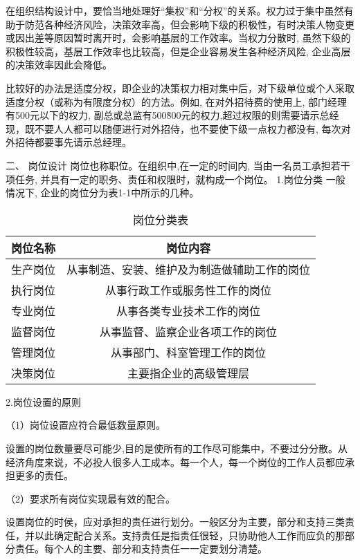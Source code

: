 \documentclass[CJK]{z-article}
\begin{document}
    在组织结构设计中，要恰当地处理好“集权”和“分权”的关系。权力过于集中虽然有助于防范各种经济风险，决策效率高，但会影响下级的积极性，有时决策人物变更或因出差等原因暂时离开时，会影响基层的工作效率。当权力分散时, 虽然下级的积极性较高，基层工作效率也比较高，但是企业容易发生各种经济风险, 企业高层的决策效率因此会降低。

    比较好的办法是适度分权，即企业的决策权力相对集中后，对下级单位或个人采取适度分权（或称为有限度分权）的方法。例如, 在对外招待费的使用上, 部门经理有500元以下的权力, 副总或总监有500\~800元的权力,超过权限的则需要请示总经现，既不要人人都可以随便进行对外招侍，也不要使下级一点权力都没有, 每次对外招待都要事先请示总经理。

二、 岗位设计
    岗位也称职位。在组织中,在一定的时间内, 当由一名员工承担若干项任务, 并具有一定的职务、责任和权限时，就构成一个岗位。
    1.岗位分类
    一般情况下, 企业的岗位分为表1-1中所示的几种。
    \begin{table}
		\centering
        \caption{岗位分类表}
        \begin{tabular}{c|c}
            \hline  岗位名称&岗位内容 \\
            \hline  生产岗位&从事制造、安装、维护及为制造做辅助工作的岗位 \\
            \hline  执行岗位&从事行政工作或服务性工作的岗位 \\
            \hline  专业岗位&从事各类专业技术工作的岗位 \\
            \hline  监督岗位&从事监督、监察企业各项工作的岗位 \\
            \hline  管理岗位&从事部门、科室管理工作的岗位 \\
            \hline  决策岗位&主要指企业的高级管理层 \\
            \hline
        \end{tabular}
    \end{table}

    2.岗位设置的原则

    （1）岗位设置应符合最低数量原则。

    设置的岗位数量要尽可能少,目的是使所有的工作尽可能集中，不要过分分散。从经济角度来说，不必投人很多人工成本。每一个人，每一个岗位的工作人员都应承担更多的责任。

    （2）要求所有岗位实现最有效的配合。

    设置岗位的时侯，应对承担的责任进行划分。一般区分为主要，部分和支持三类责任，并以此确定配合关系。支持责任是指责任很轻，只协助他人工作而应负的那部分责任。每个人的主要、部分和支持责任一一定要划分清楚。
\end{document}

